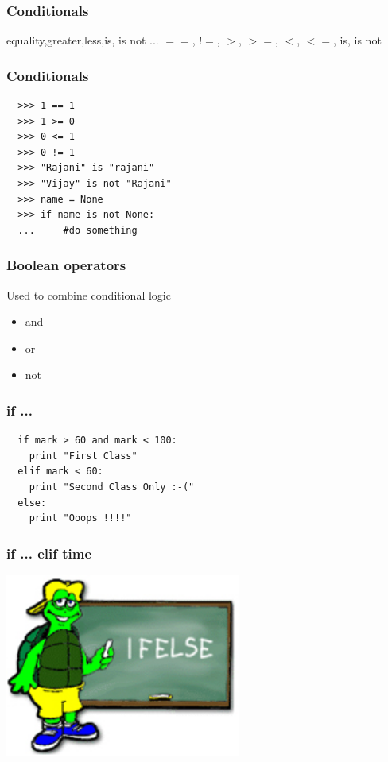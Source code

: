 \documentclass{beamer}
\begin{document}
\begin{frame}[fragile]
 \frametitle{Conditionals}
 \begin{block}{equality,greater,less,is, is not ...}
 $==$, $!=$, $>$, $>=$, $<$, $<=$, is, is not
 \end{block}

\end{frame}

\begin{frame}[fragile]
 \frametitle{Conditionals}
 \begin{verbatim}
  >>> 1 == 1
  >>> 1 >= 0
  >>> 0 <= 1
  >>> 0 != 1
  >>> "Rajani" is "rajani"
  >>> "Vijay" is not "Rajani"
  >>> name = None
  >>> if name is not None:
  ...     #do something
 \end{verbatim}

\end{frame}

\begin{frame}[fragile]
 \frametitle{Boolean operators}
 Used to combine conditional logic
 \begin{itemize}
  \item and
  \item or
  \item not
 \end{itemize}

\end{frame}

\begin{frame}[fragile]
 \frametitle{if ...}
 \begin{verbatim}
  if mark > 60 and mark < 100:
    print "First Class"
  elif mark < 60:
    print "Second Class Only :-("
  else:
    print "Ooops !!!!"
 \end{verbatim}

\end{frame}

\begin{frame}
 \frametitle{if ... elif time }
 \includegraphics[height=6cm]{ifelse.jpg}
\end{frame}
\end{document}
